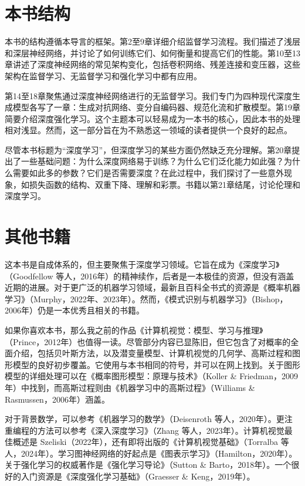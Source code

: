 \documentclass[lang=cn,newtx,10pt,scheme=chinese]{elegantbook}
\begin{document}
\section{本书结构}
本书的结构遵循本导言的框架。第2至9章详细介绍监督学习流程。我们描述了浅层和深层神经网络，并讨论了如何训练它们、如何衡量和提高它们的性能。第10至13章讲述了深度神经网络的常见架构变化，包括卷积网络、残差连接和变压器，这些架构在监督学习、无监督学习和强化学习中都有应用。

第14至18章聚焦通过深度神经网络进行的无监督学习。我们专门为四种现代深度生成模型各写了一章：生成对抗网络、变分自编码器、规范化流和扩散模型。第19章简要介绍深度强化学习。这个主题本可以轻易成为一本书的核心，因此本书的处理相对浅显。然而，这一部分旨在为不熟悉这一领域的读者提供一个良好的起点。

尽管本书标题为“深度学习”，但深度学习的某些方面仍然缺乏充分理解。第20章提出了一些基础问题：为什么深度网络易于训练？为什么它们泛化能力如此强？为什么需要如此多的参数？它们是否需要深度？在此过程中，我们探讨了一些意外现象，如损失函数的结构、双重下降、理解和彩票。书籍以第21章结尾，讨论伦理和深度学习。
\section{其他书籍}
这本书是自成体系的，但主要聚焦于深度学习领域。它旨在成为《深度学习》（Goodfellow 等人，2016年）的精神续作，后者是一本极佳的资源，但没有涵盖近期的进展。对于更广泛的机器学习领域，最新且百科全书式的资源是《概率机器学习》（Murphy，2022年、2023年）。然而，《模式识别与机器学习》（Bishop，2006年）仍是一本优秀且相关的书籍。

如果你喜欢本书，那么我之前的作品《计算机视觉：模型、学习与推理》（Prince，2012年）也值得一读。尽管部分内容已显陈旧，但它包含了对概率的全面介绍，包括贝叶斯方法，以及潜变量模型、计算机视觉的几何学、高斯过程和图形模型的良好初步覆盖。它使用与本书相同的符号，并可以在网上找到。关于图形模型的详细处理可以在《概率图形模型：原理与技术》（Koller \& Friedman，2009年）中找到，而高斯过程则由《机器学习中的高斯过程》（Williams \& Rasmussen，2006年）涵盖。

对于背景数学，可以参考《机器学习的数学》（Deisenroth 等人，2020年）。更注重编程的方法可以参考《深入深度学习》（Zhang 等人，2023年）。计算机视觉最佳概述是 Szeliski（2022年），还有即将出版的《计算机视觉基础》（Torralba 等人，2024年）。学习图神经网络的好起点是《图表示学习》（Hamilton，2020年）。关于强化学习的权威著作是《强化学习导论》（Sutton \& Barto，2018年）。一个很好的入门资源是《深度强化学习基础》（Graesser \& Keng，2019年）。
\end{document}
